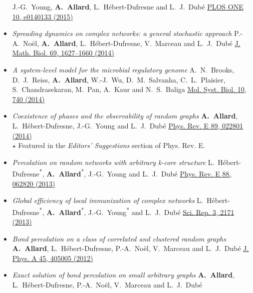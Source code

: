 \documentclass[11pt]{article}
\begin{document}
\begin{itemize}[itemsep=0.5em]
  J.-G.~Young, \textbf{A.~Allard}, L.~H\'ebert-Dufresne and L.~J.~Dub\'e\split
  \href{http://dx.doi.org/10.1371/journal.pone.0140133}{PLOS ONE 10, e0140133 (2015)}
%
  \item \textit{Spreading dynamics on complex networks: a general stochastic approach}\split
  P.-A.~No\"el, \textbf{A.~Allard}, L.~H\'ebert-Dufresne, V.~Marceau and L.~J.~Dub\'e\split
  \href{http://dx.doi.org/10.1007/s00285-013-0744-9}{J. Math. Biol. 69, 1627--1660 (2014)}
%
  \item \textit{A system-level model for the microbial regulatory genome}\split
  A.~N.~Brooks, D.~J.~Reiss, \textbf{A.~Allard}, W.-J.~Wu, D.~M.~Salvanha, C.~L.~Plaisier, S.~Chandrasekaran, M.~Pan, A.~Kaur and N.~S.~Baliga\split
  \href{http://dx.doi.org/10.15252/msb.20145160}{Mol. Syst. Biol. 10, 740 (2014)}
%
  \item \textit{Coexistence of phases and the observability of random graphs}\split
  \textbf{A.~Allard}, L.~H\'ebert-Dufresne, J.-G.~Young and L.~J.~Dub\'e\split
  \href{http://dx.doi.org/10.1103/PhysRevE.89.022801}{Phys. Rev. E 89, 022801 (2014)}\\
  {\footnotesize $\star$ Featured in the \textit{Editors' Suggestions} section of Phys. Rev. E.}
%
  \item\textit{Percolation on random networks with arbitrary k-core structure}\split
  L.~H\'ebert-Dufresne\textsuperscript{*}, \textbf{A.~Allard}\textsuperscript{*}, J.-G.~Young and L.~J.~Dub\'e\split
  \href{http://dx.doi.org/10.1103/PhysRevE.88.062820}{Phys. Rev. E 88, 062820 (2013)}
%
  \item \textit{Global efficiency of local immunization of complex networks}\split
  L.~H\'ebert-Dufresne\textsuperscript{*}, \textbf{A.~Allard}\textsuperscript{*}, J.-G.~Young\textsuperscript{*} and L.~J.~Dub\'e\split
  \href{http://dx.doi.org/10.1038/srep02171}{Sci. Rep. 3, 2171 (2013)}
%
  \item \textit{Bond percolation on a class of correlated and clustered random graphs}\split
  \textbf{A.~Allard}, L.~H\'ebert-Dufresne, P.-A.~No\"el, V.~Marceau and L.~J.~Dub\'e\split
  \href{http://dx.doi.org/10.1088/1751-8113/45/40/405005}{J. Phys. A 45, 405005 (2012)}
%
  \item \textit{Exact solution of bond percolation on small arbitrary graphs}\split
  \textbf{A.~Allard}, L.~H\'ebert-Dufresne, P.-A.~No\"el, V.~Marceau and L.~J.~Dub\'e\split

\end{itemize}
\end{document}

